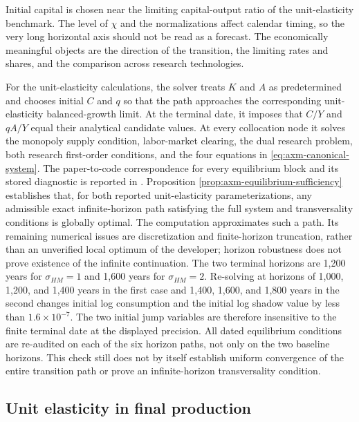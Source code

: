 Initial capital is chosen near the limiting capital-output ratio of the
unit-elasticity benchmark. The level of
\(\chi\) and the normalizations affect calendar timing, so the very long horizontal
axis should not be read as a forecast. The economically meaningful objects are
the direction of the transition, the limiting rates and shares, and the
comparison across research technologies.

For the unit-elasticity calculations, the solver treats \(K\) and \(A\) as
predetermined and chooses initial \(C\) and
\(q\) so that the path approaches the corresponding unit-elasticity
balanced-growth limit. At the terminal date, it imposes that \(C/Y\) and \(qA/Y\)
equal their analytical candidate values. At every
collocation node it solves the monopoly supply condition, labor-market clearing,
the dual research problem, both research first-order conditions, and the four
equations in \eqref{eq:axm-canonical-system}.
The paper-to-code correspondence for every equilibrium block and its stored
diagnostic is reported in
. Proposition
\ref{prop:axm-equilibrium-sufficiency} establishes that, for both reported
unit-elasticity parameterizations, any admissible exact infinite-horizon path satisfying the full
system and transversality conditions is globally optimal. The computation
approximates such a path. Its remaining numerical issues are discretization and
finite-horizon truncation, rather than an unverified local optimum of the
developer; horizon robustness does not prove existence of the infinite
continuation.
The two terminal horizons are 1,200 years for \(\sigma_{HM}=1\) and 1,600 years
for \(\sigma_{HM}=2\). Re-solving at horizons of 1,000, 1,200, and 1,400 years in
the first case and 1,400, 1,600, and 1,800 years in the second changes initial
log consumption and the initial log shadow value by less than
\(1.6\times10^{-7}\). The two initial jump variables are therefore insensitive to
the finite terminal date at the displayed precision. All dated equilibrium
conditions are re-audited on each of the six horizon paths, not only on the two
baseline horizons. This check still does not by itself establish uniform
convergence of the entire transition path or prove an infinite-horizon
transversality condition.

\subsection{Unit elasticity in final production}

